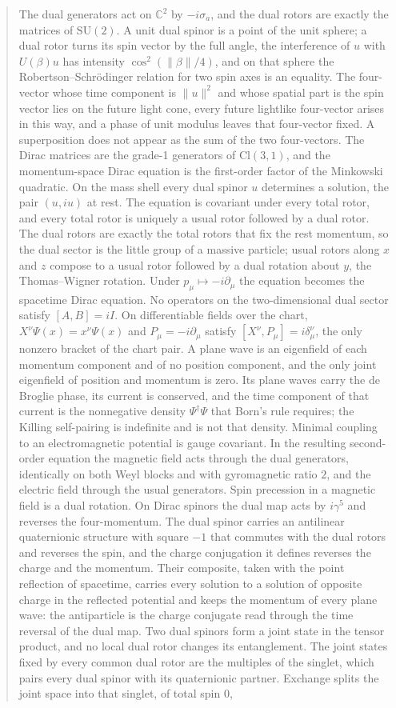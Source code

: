 \documentclass[a4paper]{article}
\begin{document}
\begin{abstract}
The dual generators act on $\mathbb{C}^2$ by $-i\sigma_a$, and the dual rotors are exactly the matrices of $\mathrm{SU}(2)$. A unit dual spinor is a point of the unit sphere; a dual rotor turns its spin vector by the full angle, the interference of $u$ with $U(\beta)u$ has intensity $\cos^2(\lVert\beta\rVert/4)$, and on that sphere the Robertson--Schrödinger relation for two spin axes is an equality. The four-vector whose time component is $\lVert u\rVert^2$ and whose spatial part is the spin vector lies on the future light cone, every future lightlike four-vector arises in this way, and a phase of unit modulus leaves that four-vector fixed. A superposition does not appear as the sum of the two four-vectors. The Dirac matrices are the grade-1 generators of $\mathrm{Cl}(3,1)$, and the momentum-space Dirac equation is the first-order factor of the Minkowski quadratic. On the mass shell every dual spinor $u$ determines a solution, the pair $(u,iu)$ at rest. The equation is covariant under every total rotor, and every total rotor is uniquely a usual rotor followed by a dual rotor. The dual rotors are exactly the total rotors that fix the rest momentum, so the dual sector is the little group of a massive particle; usual rotors along $x$ and $z$ compose to a usual rotor followed by a dual rotation about $y$, the Thomas--Wigner rotation. Under $p_\mu\mapsto -i\partial_\mu$ the equation becomes the spacetime Dirac equation. No operators on the two-dimensional dual sector satisfy $[A,B]=iI$. On differentiable fields over the chart, $X^\nu\Psi(x)=x^\nu\Psi(x)$ and $P_\mu=-i\partial_\mu$ satisfy $[X^\nu,P_\mu]=i\delta^\nu_\mu$, the only nonzero bracket of the chart pair. A plane wave is an eigenfield of each momentum component and of no position component, and the only joint eigenfield of position and momentum is zero. Its plane waves carry the de Broglie phase, its current is conserved, and the time component of that current is the nonnegative density $\Psi^\dagger\Psi$ that Born's rule requires; the Killing self-pairing is indefinite and is not that density. Minimal coupling to an electromagnetic potential is gauge covariant. In the resulting second-order equation the magnetic field acts through the dual generators, identically on both Weyl blocks and with gyromagnetic ratio $2$, and the electric field through the usual generators. Spin precession in a magnetic field is a dual rotation. On Dirac spinors the dual map acts by $i\gamma^5$ and reverses the four-momentum. The dual spinor carries an antilinear quaternionic structure with square $-1$ that commutes with the dual rotors and reverses the spin, and the charge conjugation it defines reverses the charge and the momentum. Their composite, taken with the point reflection of spacetime, carries every solution to a solution of opposite charge in the reflected potential and keeps the momentum of every plane wave: the antiparticle is the charge conjugate read through the time reversal of the dual map. Two dual spinors form a joint state in the tensor product, and no local dual rotor changes its entanglement. The joint states fixed by every common dual rotor are the multiples of the singlet, which pairs every dual spinor with its quaternionic partner. Exchange splits the joint space into that singlet, of total spin $0$, 
\end{abstract}
\end{document}
